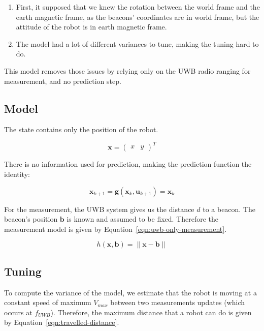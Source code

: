 \documentclass[a4paper, 12pt]{scrreprt}
\begin{document}
\begin{enumerate}
\item First, it supposed that we knew the rotation between the world frame and the earth magnetic frame, as the beacons' coordinates are in world frame, but the attitude of the robot is in earth magnetic frame.
\item The model had a lot of different variances to tune, making the tuning hard to do.
\end{enumerate}

This model removes those issues by relying only on the UWB radio ranging for measurement, and no prediction step.

\subsection{Model}

The state contains only the position of the robot.

\begin{equation*}
\mathbf{x} = \begin{pmatrix}x & y\end{pmatrix}^T
\end{equation*}


There is no information used for prediction, making the prediction function the identity:

\begin{equation}
    \mathbf{x}_{k+1} = \mathbf{g}(\mathbf{x}_k, \mathbf{u}_{k+1}) = \mathbf{x}_{k}
\end{equation}

For the measurement, the UWB system gives us the distance $d$ to a beacon.
The beacon's position $\mathbf{b}$ is known and assumed to be fixed.
Therefore the measurement model is given by Equation~\ref{eqn:uwb-only-measurement}.

\begin{equation}
    h(\mathbf{x}, \mathbf{b}) = \lVert \mathbf{x} - \mathbf{b} \rVert
\label{eqn:uwb-only-measurement}
\end{equation}

\subsection{Tuning}

To compute the variance of the model, we estimate that the robot is moving at a constant speed of maximum $V_{max}$ between two measurements updates (which occurs at \(f_{UWB}\)).
Therefore, the maximum distance that a robot can do is given by Equation~\ref{eqn:travelled-distance}.
\end{document}
